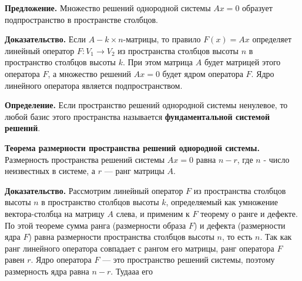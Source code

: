 \documentclass[a4paper]{article}
\begin{document}
\begin{htheorem}
\textbf{Предложение.} Множество решений однородной системы $Ax=0$ образует подпространство в пространстве столбцов.
\end{htheorem}

\begin{hproof}
\textbf{Доказательство.} Если $A - k \times n$-матрицы, то правило $F(x) = Ax$ определяет линейный оператор $F: V_1 \rightarrow V_2$ из пространства столбцов высоты $n$ в пространство столбцов высоты $k$. При этом матрица $A$ будет матрицей этого оператора $F$, а множество решений $Ax=0$ будет ядром оператора $F$. Ядро линейного оператора является подпространством.

\end{hproof}

\textbf{Определение.} Если пространство решений однородной системы ненулевое, то любой базис этого пространства называется \textbf{фундаментальной системой решений}.

\begin{htheorem}
\textbf{Теорема  размерности пространства решений однородной системы.} Размерность пространства решений системы $Ax=0$ равна $n-r$, где $n$ - число неизвестных в системе, а $r$ --- ранг матрицы $A$.
\end{htheorem}

\begin{hproof}
\textbf{Доказательство.} Рассмотрим линейный оператор $F$ из пространства столбцов высоты $n$ в пространство столбцов высоты $k$, определяемый как умножение вектора-столбца на матрицу $A$ слева, и применим к $F$ теорему о ранге и дефекте. По этой теореме сумма ранга (размерности образа $F$) и дефекта (размерности ядра  $F$) равна размерности пространства столбцов высоты $n$, то есть $n$. Так как ранг линейного оператора совпадает с рангом его матрицы, ранг оператора $F$ равен $r$. Ядро оператора $F$ --- это пространство решений системы, поэтому размерность ядра равна $n-r$. Тудааа его
\end{hproof}
    
\end{document}
